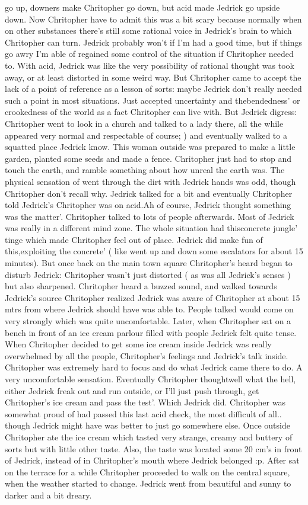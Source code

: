 \documentclass[12pt]{book}
\begin{document}
go up, downers make Chritopher go down, but acid made Jedrick go upside down. Now Chritopher have to admit this was a bit scary because normally when on other substances there's still some rational voice in Jedrick's brain to which Chritopher can turn. Jedrick probably won't if I'm had a good time, but if things go awry I'm able of regained some control of the situation if Chritopher needed to. With acid, Jedrick was like the very possibility of rational thought was took away, or at least distorted in some weird way. But Chritopher came to accept the lack of a point of reference as a lesson of sorts: maybe Jedrick don't really needed such a point in most situations. Just accepted uncertainty and thebendedness' or crookedness of the world as a fact Chritopher can live with. But Jedrick digress: Chritopher went to look in a church and talked to a lady there, all the while appeared very normal and respectable of course; ) and eventually walked to a squatted place Jedrick know. This woman outside was prepared to make a little garden, planted some seeds and made a fence. Chritopher just had to stop and touch the earth, and ramble something about how unreal the earth was. The physical sensation of went through the dirt with Jedrick hands was odd, though Chritopher don't recall why. Jedrick talked for a bit and eventually Chritopher told Jedrick's Chritopher was on acid.Ah of course, Jedrick thought something was the matter'. Chritopher talked to lots of people afterwards. Most of Jedrick was really in a different mind zone. The whole situation had thisconcrete jungle' tinge which made Chritopher feel out of place. Jedrick did make fun of this,exploiting the concrete' ( like went up and down some escalators for about 15 minutes). But once back on the main town square Chritopher's heard began to disturb Jedrick: Chritopher wasn't just distorted ( as was all Jedrick's senses ) but also sharpened. Chritopher heard a buzzed sound, and walked towards Jedrick's source Chritopher realized Jedrick was aware of Chritopher at about 15 mtrs from where Jedrick should have was able to. People talked would come on very strongly which was quite uncomfortable. Later, when Chritopher sat on a bench in front of an ice cream parlour filled with people Jedrick felt quite tense. When Chritopher decided to get some ice cream inside Jedrick was really overwhelmed by all the people, Chritopher's feelings and Jedrick's talk inside. Chritopher was extremely hard to focus and do what Jedrick came there to do. A very uncomfortable sensation. Eventually Chritopher thoughtwell what the hell, either Jedrick freak out and run outside, or I'll just push through, get Chritopher's ice cream and pass the test'. Which Jedrick did. Chritopher was somewhat proud of had passed this last acid check, the most difficult of all.. though Jedrick might have was better to just go somewhere else. Once outside Chritopher ate the ice cream which tasted very strange, creamy and buttery of sorts but with little other taste. Also, the taste was located some 20 cm's in front of Jedrick, instead of in Chritopher's mouth where Jedrick belonged :p. After sat on the terrace for a while Chritopher proceeded to walk on the central square, when the weather started to change. Jedrick went from beautiful and sunny to darker and a bit dreary. 
\end{document}

